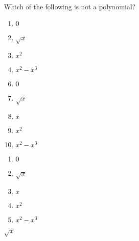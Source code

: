 


 Which of the following is not a polynomial?


\ifsat
	\begin{enumerate}[label=\Alph*)]
		\item   $0$
		\item  $\sqrt{x}$ %
		\item  $x^{2}$
		\item   $x^{2}-x^{3}$
	\end{enumerate}
\else
\fi

\ifacteven
	\begin{enumerate}[label=\textbf{\Alph*.},itemsep=\fill,align=left]
		\setcounter{enumii}{5}
		\item   $0$
		\item  $\sqrt{x}$ %
		\item  $x$
		\addtocounter{enumii}{1}
		\item  $x^{2}$
		\item   $x^{2}-x^{3}$
	\end{enumerate}
\else
\fi

\ifactodd
	\begin{enumerate}[label=\textbf{\Alph*.},itemsep=\fill,align=left]
		\item   $0$
		\item  $\sqrt{x}$ %
		\item  $x$
		\item  $x^{2}$
		\item   $x^{2}-x^{3}$
	\end{enumerate}
\else
\fi

\ifgridin
  $\sqrt{x}$ %
		
\else
\fi

